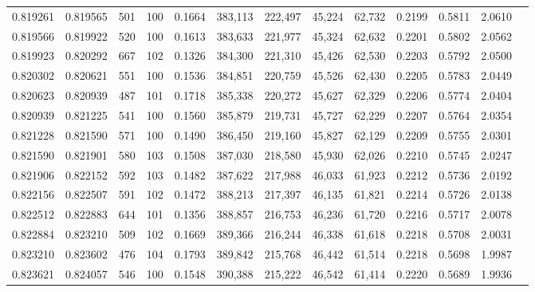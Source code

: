 \begin{tabular}{rrrrrrrrrrrrr}
0.819261 & 0.819565 &   501 & 100 &                                     0.1664 & 383,113 & 222,497 &  45,224 &  62,732 & 0.2199 & 0.5811 & 2.0610 \\
0.819566 & 0.819922 &   520 & 100 &                                     0.1613 & 383,633 & 221,977 &  45,324 &  62,632 & 0.2201 & 0.5802 & 2.0562 \\
0.819923 & 0.820292 &   667 & 102 &                                     0.1326 & 384,300 & 221,310 &  45,426 &  62,530 & 0.2203 & 0.5792 & 2.0500 \\
0.820302 & 0.820621 &   551 & 100 &                                     0.1536 & 384,851 & 220,759 &  45,526 &  62,430 & 0.2205 & 0.5783 & 2.0449 \\
0.820623 & 0.820939 &   487 & 101 &                                     0.1718 & 385,338 & 220,272 &  45,627 &  62,329 & 0.2206 & 0.5774 & 2.0404 \\
0.820939 & 0.821225 &   541 & 100 &                                     0.1560 & 385,879 & 219,731 &  45,727 &  62,229 & 0.2207 & 0.5764 & 2.0354 \\
0.821228 & 0.821590 &   571 & 100 &                                     0.1490 & 386,450 & 219,160 &  45,827 &  62,129 & 0.2209 & 0.5755 & 2.0301 \\
0.821590 & 0.821901 &   580 & 103 &                                     0.1508 & 387,030 & 218,580 &  45,930 &  62,026 & 0.2210 & 0.5745 & 2.0247 \\
0.821906 & 0.822152 &   592 & 103 &                                     0.1482 & 387,622 & 217,988 &  46,033 &  61,923 & 0.2212 & 0.5736 & 2.0192 \\
0.822156 & 0.822507 &   591 & 102 &                                     0.1472 & 388,213 & 217,397 &  46,135 &  61,821 & 0.2214 & 0.5726 & 2.0138 \\
0.822512 & 0.822883 &   644 & 101 &                                     0.1356 & 388,857 & 216,753 &  46,236 &  61,720 & 0.2216 & 0.5717 & 2.0078 \\
0.822884 & 0.823210 &   509 & 102 &                                     0.1669 & 389,366 & 216,244 &  46,338 &  61,618 & 0.2218 & 0.5708 & 2.0031 \\
0.823210 & 0.823602 &   476 & 104 &                                     0.1793 & 389,842 & 215,768 &  46,442 &  61,514 & 0.2218 & 0.5698 & 1.9987 \\
0.823621 & 0.824057 &   546 & 100 &                                     0.1548 & 390,388 & 215,222 &  46,542 &  61,414 & 0.2220 & 0.5689 & 1.9936 \\

\end{tabular}
